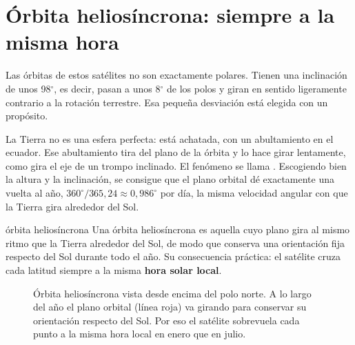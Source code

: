 \section{Órbita heliosíncrona: siempre a la misma hora}

Las órbitas de estos satélites no son exactamente polares. Tienen una inclinación de unos
98$^\circ$, es decir, pasan a unos 8$^\circ$ de los polos y giran en sentido ligeramente
contrario a la rotación terrestre. Esa pequeña desviación está elegida con un propósito.

La Tierra no es una esfera perfecta: está achatada, con un abultamiento en el ecuador. Ese
abultamiento tira del plano de la órbita y lo hace girar lentamente, como gira el eje de un
trompo inclinado. El fenómeno se llama . Escogiendo bien la altura y la
inclinación, se consigue que el plano orbital dé exactamente una vuelta al año,
$360^\circ/365{,}24 \approx 0{,}986^\circ$ por día, la misma velocidad angular con que la Tierra
gira alrededor del Sol.

\begin{definicion}{órbita heliosíncrona}
Una órbita heliosíncrona es aquella cuyo plano gira al mismo ritmo que la Tierra alrededor del
Sol, de modo que conserva una orientación fija respecto del Sol durante todo el año. Su
consecuencia práctica: el satélite cruza cada latitud siempre a la misma \textbf{hora solar
local}.
\end{definicion}

\begin{figure}[ht]
\centering
{}
\caption{Órbita heliosíncrona vista desde encima del polo norte. A lo largo del año el plano
orbital (línea roja) va girando para conservar su orientación respecto del Sol. Por eso el
satélite sobrevuela cada punto a la misma hora local en enero que en julio.}
\label{fig:helio}
\end{figure}

